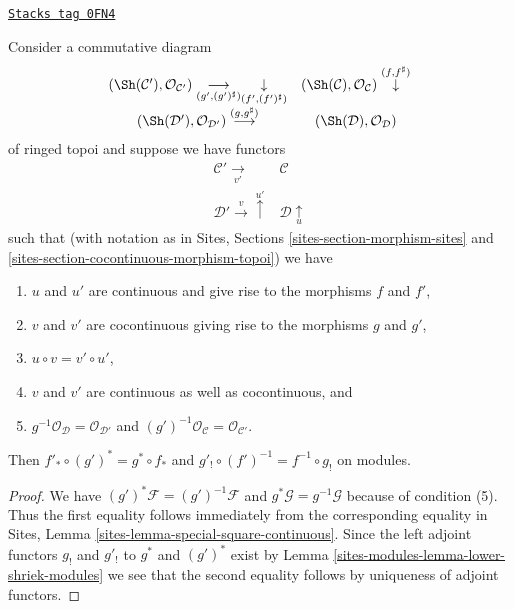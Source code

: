 \begin{lemma}
\label{sites-modules-lemma-special-square-continuous}
\href{https://stacks.math.columbia.edu/tag/0FN4}{\texttt{Stacks tag 0FN4}}

Consider a commutative diagram
$$
\begin{array}{cc}(\Sh(\mathcal{C}'), \mathcal{O}_{\mathcal{C}'})
\underset{(g', (g')^\sharp)}{\longrightarrow}\underset{(f', (f')^\sharp)}{\downarrow} & (\Sh(\mathcal{C}), \mathcal{O}_\mathcal{C}) \overset{(f, f^\sharp)}{\downarrow} \\ (\Sh(\mathcal{D}'), \mathcal{O}_{\mathcal{D}'}) \overset{(g, g^\sharp)}{\longrightarrow} & (\Sh(\mathcal{D}), \mathcal{O}_\mathcal{D})\end{array}
$$
of ringed topoi and suppose we have functors
$$
\begin{array}{cc}\mathcal{C}' \underset{v'}{\longrightarrow} & \mathcal{C} \\ \mathcal{D}' \overset{v}{\longrightarrow}\overset{u'}{\uparrow} & \mathcal{D} \underset{u}{\uparrow}\end{array}
$$
such that (with notation as in
Sites, Sections \ref{sites-section-morphism-sites} and
\ref{sites-section-cocontinuous-morphism-topoi}) we have
\begin{enumerate}
\item $u$ and $u'$ are continuous and give rise to the morphisms
$f$ and $f'$,
\item $v$ and $v'$ are cocontinuous giving rise to the morphisms $g$ and $g'$,
\item $u \circ v = v' \circ u'$,
\item $v$ and $v'$ are continuous as well as cocontinuous, and
\item $g^{-1}\mathcal{O}_{\mathcal{D}} = \mathcal{O}_{\mathcal{D}'}$
and $(g')^{-1}\mathcal{O}_{\mathcal{C}} = \mathcal{O}_{\mathcal{C}'}$.
\end{enumerate}
Then $f'_* \circ (g')^* = g^* \circ f_*$ and
$g'_! \circ (f')^{-1} = f^{-1} \circ g_!$ on modules.
\end{lemma}

\begin{proof}
We have $(g')^*\mathcal{F} = (g')^{-1}\mathcal{F}$ and
$g^*\mathcal{G} = g^{-1}\mathcal{G}$ because of condition (5).
Thus the first equality follows immediately from the corresponding
equality in Sites, Lemma \ref{sites-lemma-special-square-continuous}.
Since the left adjoint functors $g_!$ and $g'_!$ to $g^*$ and $(g')^*$
exist by Lemma \ref{sites-modules-lemma-lower-shriek-modules}
we see that the second equality follows by
uniqueness of adjoint functors.
\end{proof}

